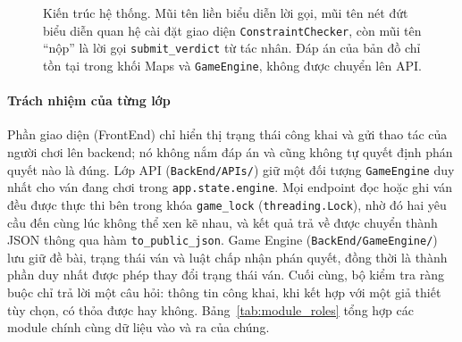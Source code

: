 \begin{sloppypar}
\begin{figure}[htbp]
  \caption{Kiến trúc hệ thống. Mũi tên liền biểu diễn lời gọi, mũi tên nét
    đứt biểu diễn quan hệ cài đặt giao diện \texttt{ConstraintChecker}, còn mũi
    tên ``nộp'' là lời gọi \texttt{submit\_verdict} từ tác nhân. Đáp án của bản
    đồ chỉ tồn tại trong khối Maps và \texttt{GameEngine}, không được chuyển lên
    API.}
  \label{fig:architecture}
\end{figure}

\paragraph{Trách nhiệm của từng lớp}
Phần giao diện (FrontEnd) chỉ hiển thị trạng thái công khai và gửi thao tác của
người chơi lên backend; nó không nắm đáp án và cũng không tự quyết định phán
quyết nào là đúng. Lớp API (\nolinkurl{BackEnd/APIs/}) giữ một đối tượng
\texttt{GameEngine} duy nhất cho ván đang chơi trong \texttt{app.state.engine}.
Mọi endpoint đọc hoặc ghi ván đều được thực thi bên trong khóa
\texttt{game\_lock} (\texttt{threading.Lock}), nhờ đó hai yêu cầu đến cùng lúc
không thể xen kẽ nhau, và kết quả trả về được chuyển thành JSON thông qua hàm
\texttt{to\_public\_json}. Game Engine (\nolinkurl{BackEnd/GameEngine/}) lưu
giữ đề bài, trạng thái ván và luật chấp nhận phán quyết, đồng thời là thành phần
duy nhất được phép thay đổi trạng thái ván. Cuối cùng, bộ kiểm tra ràng buộc chỉ
trả lời một câu hỏi: thông tin công khai, khi kết hợp với một giả thiết tùy
chọn, có thỏa được hay không. Bảng~\ref{tab:module_roles} tổng hợp các module
chính cùng dữ liệu vào và ra của chúng.


\end{sloppypar}
